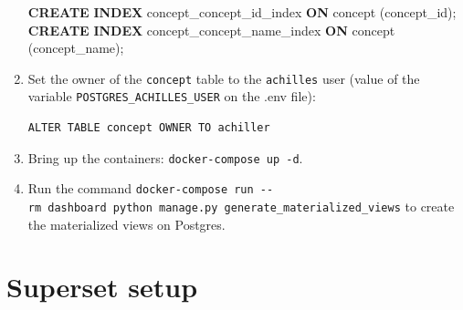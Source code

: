 \documentclass[
]{book}
\newenvironment{Shaded}{\begin{snugshade}}{\end{snugshade}}
\newcommand{\KeywordTok}[1]{\textcolor[rgb]{0.13,0.29,0.53}{\textbf{#1}}}
\newcommand{\NormalTok}[1]{#1}
\begin{document}
\begin{enumerate}
\begin{Shaded}
\begin{Highlighting}[]
\KeywordTok{CREATE} \KeywordTok{INDEX}\NormalTok{ concept\_concept\_id\_index }\KeywordTok{ON}\NormalTok{ concept (concept\_id);}
\KeywordTok{CREATE} \KeywordTok{INDEX}\NormalTok{ concept\_concept\_name\_index }\KeywordTok{ON}\NormalTok{ concept (concept\_name);}
\end{Highlighting}
\end{Shaded}
\item
  Set the owner of the \texttt{concept} table to the \texttt{achilles} user (value of the variable \texttt{POSTGRES\_ACHILLES\_USER} on the .env file):

\begin{verbatim}
ALTER TABLE concept OWNER TO achiller
\end{verbatim}
\item
  Bring up the containers: \texttt{docker-compose\ up\ -d}.
\item
  Run the command \texttt{docker-compose\ run\ -\/-rm\ dashboard\ python\ manage.py\ generate\_materialized\_views} to create the materialized views on Postgres.
\end{enumerate}

\hypertarget{superset-setup}{%
\section{Superset setup}\label{superset-setup}}
\end{document}
